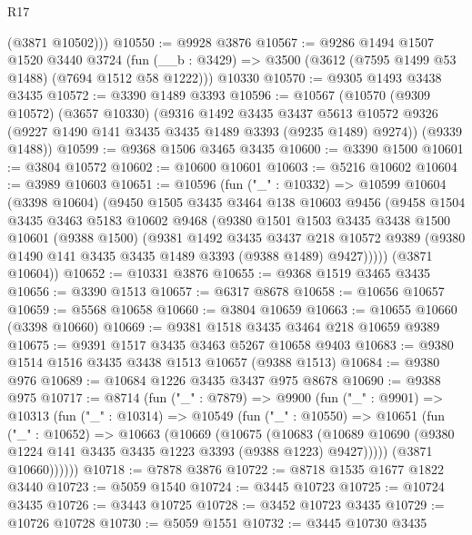 \begin{lexlean}{R17}
\begin{coremodule}
        (@3871 @10502)))
@10550 := @9928 @3876
@10567 := @9286
    @1494
    @1507
    @1520
    @3440
    @3724
    (fun (__b : @3429) => @3500 (@3612 (@7595 @1499 @53 @1488) (@7694 @1512 @58 @1222)))
    @10330
@10570 := @9305 @1493 @3438 @3435
@10572 := @3390 @1489 @3393
@10596 := @10567
    (@10570
      (@9309 @10572)
      (@3657 @10330)
      (@9316
        @1492
        @3435
        @3437
        @5613
        @10572
        @9326
        (@9227 @1490 @141 @3435 @3435 @1489 @3393 (@9235 @1489) @9274))
      (@9339 @1488))
@10599 := @9368 @1506 @3465 @3435
@10600 := @3390 @1500
@10601 := @3804 @10572
@10602 := @10600 @10601
@10603 := @5216 @10602
@10604 := @3989 @10603
@10651 := @10596
    (fun ("_" : @10332) =>
    @10599
      @10604
      (@3398 @10604)
      (@9450
        @1505
        @3435
        @3464
        @138
        @10603
        @9456
        (@9458
          @1504
          @3435
          @3463
          @5183
          @10602
          @9468
          (@9380
            @1501
            @1503
            @3435
            @3438
            @1500
            @10601
            (@9388 @1500)
            (@9381
              @1492
              @3435
              @3437
              @218
              @10572
              @9389
              (@9380 @1490 @141 @3435 @3435 @1489 @3393 (@9388 @1489) @9427)))))
      (@3871 @10604))
@10652 := @10331 @3876
@10655 := @9368 @1519 @3465 @3435
@10656 := @3390 @1513
@10657 := @6317 @8678
@10658 := @10656 @10657
@10659 := @5568 @10658
@10660 := @3804 @10659
@10663 := @10655 @10660 (@3398 @10660)
@10669 := @9381 @1518 @3435 @3464 @218 @10659 @9389
@10675 := @9391 @1517 @3435 @3463 @5267 @10658 @9403
@10683 := @9380 @1514 @1516 @3435 @3438 @1513 @10657 (@9388 @1513)
@10684 := @9380 @976
@10689 := @10684 @1226 @3435 @3437 @975 @8678
@10690 := @9388 @975
@10717 := @8714
    (fun ("_" : @7879) =>
    @9900
      (fun ("_" : @9901) =>
      @10313
        (fun ("_" : @10314) =>
        @10549
          (fun ("_" : @10550) =>
          @10651
            (fun ("_" : @10652) =>
            @10663
              (@10669
                (@10675
                  (@10683
                    (@10689
                      @10690
                      (@9380 @1224 @141 @3435 @3435 @1223 @3393 (@9388 @1223) @9427)))))
              (@3871 @10660))))))
@10718 := @7878 @3876
@10722 := @8718 @1535 @1677 @1822 @3440
@10723 := @5059 @1540
@10724 := @3445 @10723
@10725 := @10724 @3435
@10726 := @3443 @10725
@10728 := @3452 @10723 @3435
@10729 := @10726 @10728
@10730 := @5059 @1551
@10732 := @3445 @10730 @3435

\end{coremodule}
\end{lexlean}
